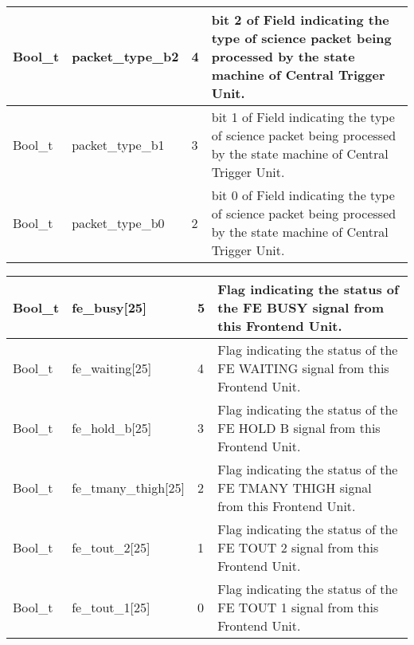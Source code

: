 \documentclass[a4paper, 12pt, onecolumn]{article}
\begin{document}
\begin{center}
\begin{supertabular}{| p{15mm} | p{37mm} | p{7mm} | p{60mm} |}
    Bool\_t   & packet\_type\_b2        & 4   & bit 2 of Field indicating the type of science packet being processed by the state machine of Central Trigger Unit. \\\hline
    Bool\_t   & packet\_type\_b1        & 3   & bit 1 of Field indicating the type of science packet being processed by the state machine of Central Trigger Unit. \\\hline
    Bool\_t   & packet\_type\_b0        & 2   & bit 0 of Field indicating the type of science packet being processed by the state machine of Central Trigger Unit. \\
  \end{supertabular}
\end{center}

\begin{center}
  \label{tab:trig-sig-con-bit}    
  \tablelasttail{\hline}
  \begin{supertabular}{| p{15mm} | p{34mm} | p{7mm} | p{63mm} |}
    Bool\_t   & fe\_busy[25]         & 5  & Flag indicating the status of the FE BUSY signal from this Frontend Unit. \\\hline
    Bool\_t   & fe\_waiting[25]      & 4  & Flag indicating the status of the FE WAITING signal from this Frontend Unit. \\\hline
    Bool\_t   & fe\_hold\_b[25]      & 3  & Flag indicating the status of the FE HOLD B signal from this Frontend Unit. \\\hline
    Bool\_t   & fe\_tmany\_thigh[25] & 2  & Flag indicating the status of the FE TMANY THIGH signal from this Frontend Unit. \\\hline
    Bool\_t   & fe\_tout\_2[25]      & 1  & Flag indicating the status of the FE TOUT 2 signal from this Frontend Unit. \\\hline
    Bool\_t   & fe\_tout\_1[25]      & 0  & Flag indicating the status of the FE TOUT 1 signal from this Frontend Unit. \\\hline
  \end{supertabular}
\end{center}
\end{document}
